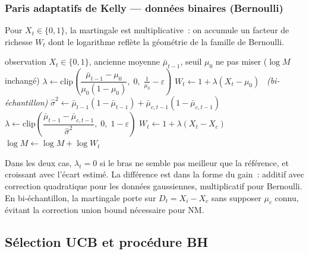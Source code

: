 \documentclass[10.5pt,a4paper]{article}
\begin{document}
\subsubsection{Paris adaptatifs de Kelly --- donn\'ees binaires (Bernoulli)}

Pour $X_t \in \{0,1\}$, la martingale est multiplicative~: on accumule un facteur de
richesse $W_t$ dont le logarithme refl\`ete la g\'eom\'etrie de la famille de Bernoulli.

\begin{algorithm}[H]
\caption{Pari de Kelly --- donn\'ees binaires (Bernoulli)}
\label{alg:kelly_bern}
\begin{algorithmic}[1]
\Require observation $X_t \in \{0,1\}$, ancienne moyenne $\bar{\mu}_{t-1}$, seuil $\mu_0$
  \State ne pas miser \quad ($\log M$ inchang\'e)
\Else
    \State $\lambda \leftarrow \mathrm{clip}\!\left(\dfrac{\bar{\mu}_{t-1}-\mu_0}{\mu_0(1-\mu_0)},\;0,\;\tfrac{1}{\mu_0}-\varepsilon\right)$
    \State $W_t \leftarrow 1 + \lambda(X_t - \mu_0)$
  \Else\ \textit{(bi-\'echantillon)}
    \State $\hat{\sigma}^2 \leftarrow \bar{\mu}_{t-1}(1-\bar{\mu}_{t-1}) + \bar{\mu}_{c,t-1}(1-\bar{\mu}_{c,t-1})$
    \State $\lambda \leftarrow \mathrm{clip}\!\left(\dfrac{\bar{\mu}_{t-1}-\bar{\mu}_{c,t-1}}{\hat{\sigma}^2},\;0,\;1-\varepsilon\right)$
    \State $W_t \leftarrow 1 + \lambda(X_t - X_c)$
  \EndIf
    \State $\log M \leftarrow \log M + \log W_t$
  \EndIf
\EndIf
\end{algorithmic}
\end{algorithm}

\begin{keyidea}
Dans les deux cas, $\lambda_t = 0$ si le bras ne semble pas meilleur que la r\'ef\'erence,
et croissant avec l'\'ecart estim\'e. La diff\'erence est dans la forme du gain~: additif
avec correction quadratique pour les donn\'ees gaussiennes, multiplicatif pour Bernoulli.
En bi-\'echantillon, la martingale porte sur $D_t = X_i - X_c$ sans supposer $\mu_c$
connu, \'evitant la correction union bound n\'ecessaire pour NM.
\end{keyidea}

\subsection{S\'election UCB et proc\'edure BH}
\end{document}
